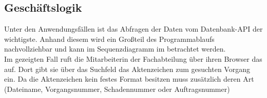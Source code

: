 


\subsection{Geschäftslogik}
\label{sec:Geschaeftslogik}
Unter den Anwendungsfällen ist das Abfragen der Daten vom Datenbank-API der wichtigste.
Anhand diesem wird ein Großteil des Programmablaufs nachvollziehbar und kann im Sequenzdiagramm
im  betrachtet werden.\\
Im gezeigten Fall ruft die Mitarbeiterin der Fachabteilung über ihren Browser das  auf.
Dort gibt sie über das Suchfeld das Aktenzeichen zum gesuchten Vorgang ein. Da die Aktenzeichen kein festes 
Format besitzen muss zusätzlich deren Art (Dateiname, Vorgangsnummer, Schadennummer oder Auftragsnummer)
